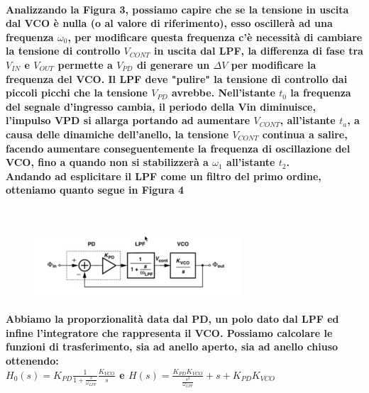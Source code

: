\documentclass{article}
\begin{document}
\paragraph{Analizzando la Figura 3, possiamo capire che se la tensione in uscita dal VCO è nulla (o al valore di riferimento), esso oscillerà ad una frequenza $\omega _{0}$, per modificare questa frequenza c'è necessità di cambiare la tensione di controllo $V_{CONT}$ in uscita dal LPF, la differenza di fase tra $V_{IN}$ e $V_{OUT}$ permette a $V_{PD}$ di generare un $\Delta V$ per modificare la frequenza del VCO. Il LPF deve "pulire" la tensione di controllo dai piccoli picchi che la tensione $V_{PD}$ avrebbe. 
Nell'istante $t_{0}$ la frequenza del segnale d'ingresso cambia, il periodo della Vin diminuisce, l'impulso VPD si allarga portando ad aumentare $V_{CONT}$, all'istante $t_{a}$, a causa delle dinamiche dell'anello, la tensione $V_{CONT}$ continua a salire, facendo aumentare conseguentemente la frequenza di oscillazione del VCO, fino a quando non si stabilizzerà a $\omega _{1}$ all'istante $t_{2}$.\\Andando ad esplicitare il LPF come un filtro del primo ordine, otteniamo quanto segue in Figura 4}
~\begin{figure}[!h]%
\includegraphics[scale=1.5]{Esplicitato.png} 
\caption{}
\label{fig:foo}
\end{figure}
\paragraph{Abbiamo la proporzionalità data dal PD, un polo dato dal LPF ed infine l'integratore che rappresenta il VCO. Possiamo calcolare le funzioni di trasferimento, sia ad anello aperto, sia ad anello chiuso ottenendo:\\$H_{0}(s)=K_{PD}\frac{1}{1+\frac{s}{\omega _{LPF}}}\frac{K_{VCO}}{s}$   e   $H(s)=\frac{K_{PD}K_{VCO}}{\frac{s^{2}}{\omega_{LPF}}}+s+K_{PD}K_{VCO}$}
\end{document}
